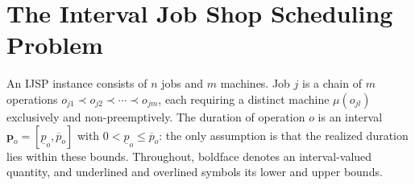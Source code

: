 \documentclass[review,authoryear,11pt]{elsarticle}
\begin{document}
\section{The Interval Job Shop Scheduling Problem}
\label{sec:problem}

An IJSP instance consists of $n$ jobs and $m$ machines. Job $j$ is a
chain of $m$ operations $o_{j1} \prec o_{j2} \prec \cdots \prec o_{jm}$,
each requiring a distinct machine $\mu(o_{jl})$ exclusively and
non-preemptively. The duration of operation $o$ is an interval
$\mathbf{p}_o = [\underline{p}_o, \overline{p}_o]$ with
$0 < \underline{p}_o \le \overline{p}_o$: the only assumption is that the
realized duration lies within these bounds. Throughout, boldface
denotes an interval-valued quantity, and underlined and overlined
symbols its lower and upper bounds.
\end{document}
